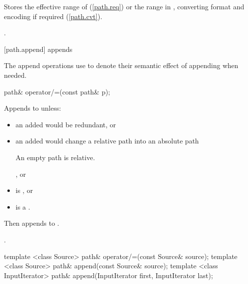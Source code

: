 \begin{itemdescr}
\pnum
\effects Stores the effective range of  (\ref{path.req})
or the range  in ,
converting format and encoding if required (\ref{path.cvt}).

\pnum
\returns {}.
\end{itemdescr}

[path.append]{ appends}

\pnum
The append operations use  to denote their semantic effect of appending
 when needed.

%
\begin{itemdecl}
path& operator/=(const path& p);
\end{itemdecl}

\begin{itemdescr}
\pnum
\effects Appends  to  unless:
\begin{itemize}
\item an added 
    would be redundant, or
\item an added  would change a relative path into an absolute path
    \begin{note} An empty path is relative.\end{note}, or
\item {} is , or
\item {} is a .
\end{itemize}
Then appends  to .

\pnum
\returns {}.
\end{itemdescr}

%
%
\begin{itemdecl}
template <class Source>
  path& operator/=(const Source& source);
template <class Source>
  path& append(const Source& source);
template <class InputIterator>
  path& append(InputIterator first, InputIterator last);
\end{itemdecl}

